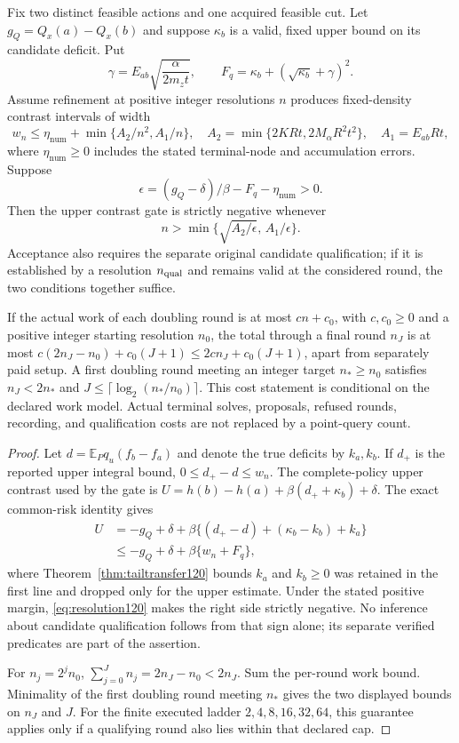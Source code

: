 \begin{proposition}
\label{prop:resolution120}
Fix two distinct feasible actions and one acquired feasible cut.
Let $g_Q=Q_x(a)-Q_x(b)$ and suppose $\kappa_b$ is a valid,
fixed upper bound on its candidate deficit.  Put
\[
 \gamma=E_{ab}\sqrt{\frac{\alpha}{2m_zt}},\qquad
 F_q=\kappa_b+(\sqrt{\kappa_b}+\gamma)^2.
\]
Assume refinement at positive integer resolutions $n$ produces
fixed-density contrast intervals of width
\[
 w_n\le \eta_{\mathrm{num}}+\min\{A_2/n^2,A_1/n\},
 \quad A_2=\min\{2KRt,2M_\alpha R^2t^2\},
 \quad A_1=E_{ab}Rt,
\]
where $\eta_{\mathrm{num}}\ge0$ includes the stated terminal-node
and accumulation errors.  Suppose
\[
 \epsilon=(g_Q-\delta)/\beta-F_q-\eta_{\mathrm{num}}>0.
\]
Then the upper contrast gate is strictly negative whenever
\begin{equation}\label{eq:resolution120}
 n>\min\{\sqrt{A_2/\epsilon},\,A_1/\epsilon\}.
\end{equation}
Acceptance also requires the separate original candidate
qualification; if it is established by a resolution $n_{\rm qual}$
and remains valid at the considered round, the two conditions
together suffice.

If the actual work of each doubling round is at most $c n+c_0$,
with $c,c_0\ge0$ and a positive integer starting resolution
$n_0$, the total through a final round $n_J$ is at most
$c(2n_J-n_0)+c_0(J+1)\le2c n_J+c_0(J+1)$,
apart from separately paid setup.
A first doubling round meeting an integer target $n_*\ge n_0$
satisfies $n_J<2n_*$ and
$J\le\lceil\log_2(n_*/n_0)\rceil$.
This cost statement is conditional on the declared work model.
Actual terminal solves, proposals, refused rounds, recording,
and qualification costs are not replaced by a point-query count.
\end{proposition}

\begin{proof}
Let $d=\mathbb E_Pq_u(f_b-f_a)$ and denote the true deficits
by $k_a,k_b$.  If $d_+$ is the reported upper integral bound,
$0\le d_+-d\le w_n$.
The complete-policy upper contrast used by the gate is
$U=h(b)-h(a)+\beta(d_++\kappa_b)+\delta$.
The exact common-risk identity gives
\begin{align*}
 U
 &=-g_Q+\delta
       +\beta\{(d_+-d)+(\kappa_b-k_b)+k_a\}\\
 &\le-g_Q+\delta+\beta\{w_n+F_q\},
\end{align*}
where Theorem~\ref{thm:tailtransfer120} bounds $k_a$ and
$k_b\ge0$ was retained in the first line and dropped only
for the upper estimate.  Under the stated positive margin,
\eqref{eq:resolution120} makes the right side strictly
negative.  No inference about candidate qualification follows
from that sign alone; its separate verified predicates are
part of the assertion.

For $n_j=2^jn_0$,
$\sum_{j=0}^J n_j=2n_J-n_0<2n_J$.
Sum the per-round work bound.  Minimality of the first
doubling round meeting $n_*$ gives the two displayed bounds
on $n_J$ and $J$.  For the finite executed ladder
$2,4,8,16,32,64$, this guarantee applies only if a qualifying
round also lies within that declared cap.
\end{proof}

